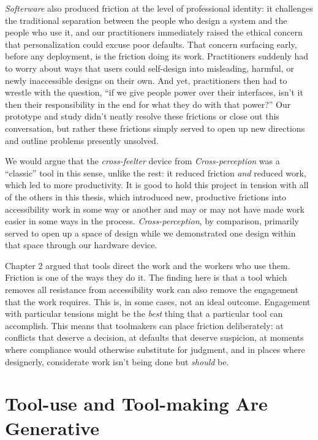 \documentclass[12pt]{cmuthesis}
\begin{document}
\textit{Softerware} also produced friction at the level of professional identity: it challenges the traditional separation between the people who design a system and the people who use it, and our practitioners immediately raised the ethical concern that personalization could excuse poor defaults. That concern surfacing early, before any deployment, is the friction doing its work. Practitioners suddenly had to worry about ways that users could self-design into misleading, harmful, or newly inaccessible designs on their own. And yet, practitioners then had to wrestle with the question, ``if we give people power over their interfaces, isn't it then their responsibility in the end for what they do with that power?'' Our prototype and study didn't neatly resolve these frictions or close out this conversation, but rather these frictions simply served to open up new directions and outline problems presently unsolved.

We would argue that the \textit{cross-feelter} device from \textit{Cross-perception} was a ``classic'' tool in this sense, unlike the rest: it reduced friction \textit{and} reduced work, which led to more productivity. It is good to hold this project in tension with all of the others in this thesis, which introduced new, productive frictions into accessibility work in some way or another and may or may not have made work easier in some ways in the process. \textit{Cross-perception}, by comparison, primarily served to open up a space of design while we demonstrated one design within that space through our hardware device.

Chapter 2 argued that tools direct the work and the workers who use them. Friction is one of the ways they do it. The finding here is that a tool which removes all resistance from accessibility work can also remove the engagement that the work requires. This is, in some cases, not an ideal outcome. Engagement with particular tensions might be the \textit{best} thing that a particular tool can accomplish. This means that toolmakers can place friction deliberately: at conflicts that deserve a decision, at defaults that deserve suspicion, at moments where compliance would otherwise substitute for judgment, and in places where designerly, considerate work isn't being done but \textit{should} be.

\section{Tool-use and Tool-making Are Generative}
\end{document}
